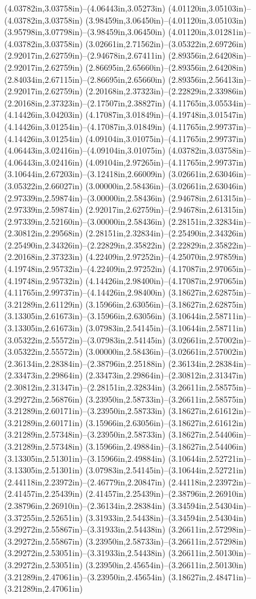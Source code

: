 (4.03782in,3.03758in)--(4.06443in,3.05273in) (4.01120in,3.05103in)--(4.03782in,3.03758in) (3.98459in,3.06450in)--(4.01120in,3.05103in) (3.95798in,3.07798in)--(3.98459in,3.06450in) (4.01120in,3.01281in)--(4.03782in,3.03758in) (3.02661in,2.71562in)--(3.05322in,2.69726in) (2.92017in,2.62759in)--(2.94678in,2.67411in) (2.89356in,2.64208in)--(2.92017in,2.62759in) (2.86695in,2.65660in)--(2.89356in,2.64208in) (2.84034in,2.67115in)--(2.86695in,2.65660in) (2.89356in,2.56413in)--(2.92017in,2.62759in) (2.20168in,2.37323in)--(2.22829in,2.33986in) (2.20168in,2.37323in)--(2.17507in,2.38827in) (4.11765in,3.05534in)--(4.14426in,3.04203in) (4.17087in,3.01849in)--(4.19748in,3.01547in) (4.14426in,3.01254in)--(4.17087in,3.01849in) (4.11765in,2.99737in)--(4.14426in,3.01254in) (4.09104in,3.01075in)--(4.11765in,2.99737in) (4.06443in,3.02416in)--(4.09104in,3.01075in) (4.03782in,3.03758in)--(4.06443in,3.02416in) (4.09104in,2.97265in)--(4.11765in,2.99737in) (3.10644in,2.67203in)--(3.12418in,2.66009in) (3.02661in,2.63046in)--(3.05322in,2.66027in) (3.00000in,2.58436in)--(3.02661in,2.63046in) (2.97339in,2.59874in)--(3.00000in,2.58436in) (2.94678in,2.61315in)--(2.97339in,2.59874in) (2.92017in,2.62759in)--(2.94678in,2.61315in) (2.97339in,2.52160in)--(3.00000in,2.58436in) (2.28151in,2.32834in)--(2.30812in,2.29568in) (2.28151in,2.32834in)--(2.25490in,2.34326in) (2.25490in,2.34326in)--(2.22829in,2.35822in) (2.22829in,2.35822in)--(2.20168in,2.37323in) (4.22409in,2.97252in)--(4.25070in,2.97859in) (4.19748in,2.95732in)--(4.22409in,2.97252in) (4.17087in,2.97065in)--(4.19748in,2.95732in) (4.14426in,2.98400in)--(4.17087in,2.97065in) (4.11765in,2.99737in)--(4.14426in,2.98400in) (3.18627in,2.62875in)--(3.21289in,2.61129in) (3.15966in,2.63056in)--(3.18627in,2.62875in) (3.13305in,2.61673in)--(3.15966in,2.63056in) (3.10644in,2.58711in)--(3.13305in,2.61673in) (3.07983in,2.54145in)--(3.10644in,2.58711in) (3.05322in,2.55572in)--(3.07983in,2.54145in) (3.02661in,2.57002in)--(3.05322in,2.55572in) (3.00000in,2.58436in)--(3.02661in,2.57002in) (2.36134in,2.28384in)--(2.38796in,2.25188in) (2.36134in,2.28384in)--(2.33473in,2.29864in) (2.33473in,2.29864in)--(2.30812in,2.31347in) (2.30812in,2.31347in)--(2.28151in,2.32834in) (3.26611in,2.58575in)--(3.29272in,2.56876in) (3.23950in,2.58733in)--(3.26611in,2.58575in) (3.21289in,2.60171in)--(3.23950in,2.58733in) (3.18627in,2.61612in)--(3.21289in,2.60171in) (3.15966in,2.63056in)--(3.18627in,2.61612in) (3.21289in,2.57348in)--(3.23950in,2.58733in) (3.18627in,2.54406in)--(3.21289in,2.57348in) (3.15966in,2.49884in)--(3.18627in,2.54406in) (3.13305in,2.51301in)--(3.15966in,2.49884in) (3.10644in,2.52721in)--(3.13305in,2.51301in) (3.07983in,2.54145in)--(3.10644in,2.52721in) (2.44118in,2.23972in)--(2.46779in,2.20847in) (2.44118in,2.23972in)--(2.41457in,2.25439in) (2.41457in,2.25439in)--(2.38796in,2.26910in) (2.38796in,2.26910in)--(2.36134in,2.28384in) (3.34594in,2.54304in)--(3.37255in,2.52651in) (3.31933in,2.54438in)--(3.34594in,2.54304in) (3.29272in,2.55867in)--(3.31933in,2.54438in) (3.26611in,2.57298in)--(3.29272in,2.55867in) (3.23950in,2.58733in)--(3.26611in,2.57298in) (3.29272in,2.53051in)--(3.31933in,2.54438in) (3.26611in,2.50130in)--(3.29272in,2.53051in) (3.23950in,2.45654in)--(3.26611in,2.50130in) (3.21289in,2.47061in)--(3.23950in,2.45654in) (3.18627in,2.48471in)--(3.21289in,2.47061in) 